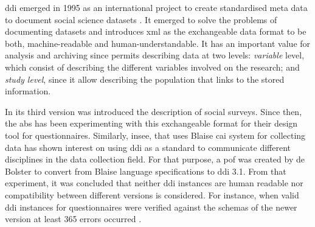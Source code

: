 	\gls{ddi} emerged in 1995 as an international project to create standardised meta data to document social science datasets \cite{art:rasmussen07}. It emerged to solve the problems of documenting datasets and introduces \gls{xml} as the exchangeable data format to be both, machine-readable and human-understandable. It has an important value for analysis and archiving since permits describing data at two levels: \emph{variable} level, which consist of describing the different variables involved on the research; and \emph{study level}, since it allow describing the population that links to the stored information. 

	In its third version was introduced the description of social surveys. Since then, the \gls{abs} has been experimenting with this exchangeable format for their design tool for questionnaires. Similarly, \gls{insee}, that uses Blaise \gls{cai} system for collecting data has shown interest on using \gls{ddi} as a standard to communicate different disciplines in the data collection field. For that purpose, a \gls{pof} was created by de Bolster to convert from Blaise language specifications to \gls{ddi} 3.1. From that experiment, it was concluded that neither \gls{ddi} instances are human readable nor compatibility between different versions is considered. For instance, when valid \gls{ddi} instances for questionnaires were verified against the schemas of the newer version at least 365 errors occurred \cite{proc:bolster13}.